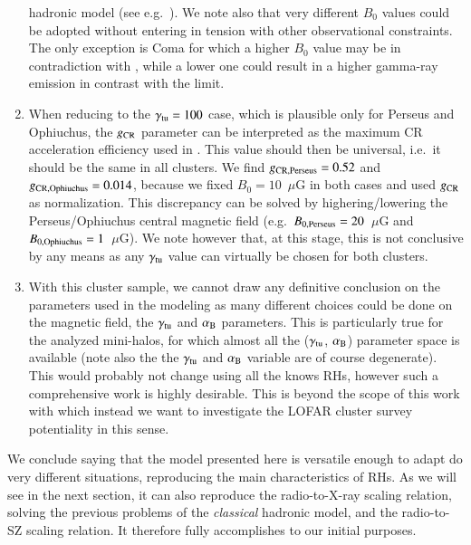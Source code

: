 \documentclass[traditabstract]{aa}
\begin{document}
\begin{enumerate}
       hadronic model (see e.g.~\citealp{2011ApJ...728...53J}). We note also that very different $B_{0}$ values could be adopted without entering 
       in tension with other observational constraints. The only exception is Coma for which a higher $B_{0}$ value may be in contradiction 
       with \cite{2010A&A...513A..30B}, while a lower one could result in a higher gamma-ray emission in contrast with the \cite{2012AAS...21920701Z}
       limit.
 \item When reducing to the $\gamma_{\rm{tu}}=100$ case, which is plausible only for Perseus and Ophiuchus, the $g_{\rm{CR}}$ parameter can be interpreted as the maximum
       CR acceleration efficiency used in \cite{2010MNRAS.409..449P}. This value should then be universal, i.e.~it should be the same in all clusters. We find 
       $g_{\rm{CR, Perseus}} = 0.52$ and $g_{\rm{CR, Ophiuchus}} = 0.014$, because we fixed $B_{0}=10$~$\mu$G in both cases and used $g_{\rm{CR}}$ as normalization. This 
       discrepancy can be solved by highering/lowering the Perseus/Ophiuchus central magnetic field (e.g.~$B_{0,\rm{Perseus}}=20$~$\mu$G and 
       $B_{0,\rm{Ophiuchus}}=1$~$\mu$G). We note however that, at this stage, this is not conclusive by any means as any $\gamma_{\rm{tu}}$ value can 
       virtually be chosen for both clusters. 
 \item With this cluster sample, we cannot draw any definitive conclusion on the parameters used in the modeling as many different choices could be done on
       the magnetic field, the $\gamma_{\rm{tu}}$ and $\alpha_{\rm{B}}$ parameters. This is particularly true for the analyzed mini-halos, for which almost all the
       ($\gamma_{\rm{tu}}$, $\alpha_{\rm{B}}$) parameter space is available (note also the the $\gamma_{\rm{tu}}$ and $\alpha_{\rm{B}}$ variable are of course degenerate). This 
       would probably not change using all the knows RHs, however such a comprehensive work is highly desirable. This is beyond the scope of this work with which instead we 
       want to investigate the LOFAR cluster survey potentiality in this sense.
\end{enumerate}

We conclude saying that the model presented here is versatile enough to adapt do very different situations, reproducing the main characteristics of RHs. As we will see in
the next section, it can also reproduce the radio-to-X-ray scaling relation, solving the previous problems of the \emph{classical} hadronic model, and the radio-to-SZ scaling relation. It therefore fully accomplishes to our initial purposes.
\end{document}

